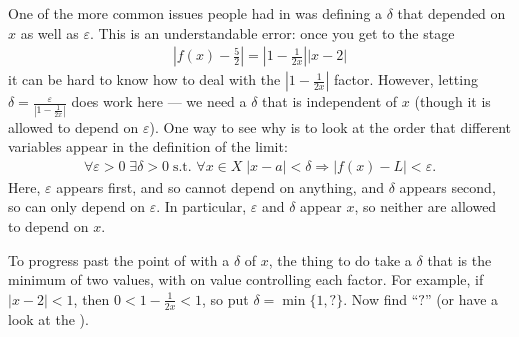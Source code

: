 \documentclass[letterpaper,10pt,english]{jupyterBook}
\begin{document}
\sphinxAtStartPar
One of the more common issues people had in {\hyperref[\detokenize{Problems:id3}]{}} was defining a \(\delta\) that depended on \(x\) as well as \(\varepsilon\). This is an understandable error: once you get to the stage
\begin{equation}\label{equation:HW-feedback:hw1}
\begin{split}\left|f(x)-\frac{5}{2}\right|=\left|1-\frac{1}{2x}\right||x-2|\end{split}
\end{equation}
\sphinxAtStartPar
it can be hard to know how to deal with the \(\left|1-\frac{1}{2x}\right|\) factor. However, letting \(\delta=\frac{\varepsilon}{|1-\frac{1}{2x}|}\) does  work here — we need a \(\delta\) that is independent of \(x\) (though it is allowed to depend on \(\varepsilon\)). One way to see why is to look at the order that different variables appear in the definition of the limit:
\begin{equation*}
\begin{split}
\forall\varepsilon>0\;\exists\delta>0\;\text{s.t. }\forall x\in X \; |x-a|<\delta\Rightarrow|f(x)-L|<\varepsilon.
\end{split}
\end{equation*}
\sphinxAtStartPar
Here, \(\varepsilon\) appears first, and so cannot depend on anything, and \(\delta\) appears second, so can only depend on \(\varepsilon\). In particular, \(\varepsilon\) and \(\delta\) appear  \(x\), so neither are allowed to depend on \(x\).

\sphinxAtStartPar
To progress past the point of {\hyperref[\detokenize{HW-feedback:equation-hw1}]{}} with a \(\delta\)  of \(x\), the thing to do take a \(\delta\) that is the minimum of two values, with on value controlling each factor. For example, if \(|x-2|<1\), then \(0<1-\frac{1}{2x}<1\), so put \(\delta=\min\{1,\text{?}\}\). Now find “\(\text{?}\)” (or have a look at the {\hyperref[\detokenize{Solutions-full:iiisol}]{}}).







\renewcommand{\indexname}{Index}
\printindex
\end{document}
